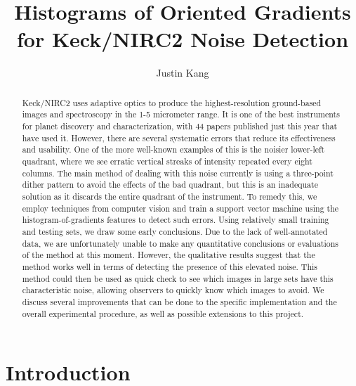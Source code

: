 \documentclass[twocolumn,longauthor]{aastex61}
\begin{document}
\title{Histograms of Oriented Gradients for Keck/NIRC2 Noise Detection}


\author{Justin Kang}



\begin{abstract}
\noindent Keck/NIRC2 uses adaptive optics to produce the highest-resolution ground-based images and spectroscopy in the 1-5 micrometer range. It is one of the best instruments for planet discovery and characterization, with 44 papers published just this year that have used it. However, there are several systematic errors that reduce its effectiveness and usability. One of the more well-known examples of this is the noisier lower-left quadrant, where we see erratic vertical streaks of intensity repeated every eight columns. The main method of dealing with this noise currently is using a three-point dither pattern to avoid the effects of the bad quadrant, but this is an inadequate solution as it discards the entire quadrant of the instrument. To remedy this, we employ techniques from computer vision and train a support vector machine using the histogram-of-gradients features to detect such errors. Using relatively small training and testing sets, we draw some early conclusions. Due to the lack of well-annotated data, we are unfortunately unable to make any quantitative conclusions or evaluations of the method at this moment. However, the qualitative results suggest that the method works well in terms of detecting the presence of this elevated noise. This method could then be used as quick check to see which images in large sets have this characteristic noise, allowing observers to quickly know which images to avoid. We discuss several improvements that can be done to the specific implementation and the overall experimental procedure, as well as possible extensions to this project. 
\end{abstract}



\section{Introduction} \label{sec:intro}
\end{document}
